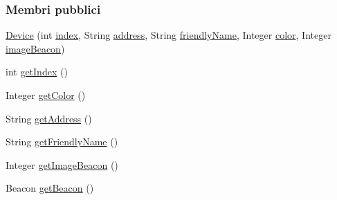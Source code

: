 \subsubsection*{Membri pubblici}
\begin{DoxyCompactItemize}
\item 
\hyperlink{classit_1_1unibo_1_1torsello_1_1bluetoothpositioning_1_1model_1_1Device_a2617f025dd33e0cae4adb3323245f865_a2617f025dd33e0cae4adb3323245f865}{Device} (int \hyperlink{classit_1_1unibo_1_1torsello_1_1bluetoothpositioning_1_1model_1_1Device_a55a01164b2388451f5e8344bfbc61ccc_a55a01164b2388451f5e8344bfbc61ccc}{index}, String \hyperlink{classit_1_1unibo_1_1torsello_1_1bluetoothpositioning_1_1model_1_1Device_a0abcf7e0df4ccc96e487c6f9b90b4e13_a0abcf7e0df4ccc96e487c6f9b90b4e13}{address}, String \hyperlink{classit_1_1unibo_1_1torsello_1_1bluetoothpositioning_1_1model_1_1Device_aa9a540b316c9de7f9b3a94f58570f6d3_aa9a540b316c9de7f9b3a94f58570f6d3}{friendly\+Name}, Integer \hyperlink{classit_1_1unibo_1_1torsello_1_1bluetoothpositioning_1_1model_1_1Device_aaba1f93e2a0f88f01262cb38a65489e6_aaba1f93e2a0f88f01262cb38a65489e6}{color}, Integer \hyperlink{classit_1_1unibo_1_1torsello_1_1bluetoothpositioning_1_1model_1_1Device_a2faee0d51162a4efebfc2db787901019_a2faee0d51162a4efebfc2db787901019}{image\+Beacon})
\item 
int \hyperlink{classit_1_1unibo_1_1torsello_1_1bluetoothpositioning_1_1model_1_1Device_a7f7e47588f721b360447d0f6ae2c4a9d_a7f7e47588f721b360447d0f6ae2c4a9d}{get\+Index} ()
\item 
Integer \hyperlink{classit_1_1unibo_1_1torsello_1_1bluetoothpositioning_1_1model_1_1Device_aad4f2885e5ed0279c7e0c6db684de5c3_aad4f2885e5ed0279c7e0c6db684de5c3}{get\+Color} ()
\item 
String \hyperlink{classit_1_1unibo_1_1torsello_1_1bluetoothpositioning_1_1model_1_1Device_ae4cd3fdda7414388cbda796f62543d5b_ae4cd3fdda7414388cbda796f62543d5b}{get\+Address} ()
\item 
String \hyperlink{classit_1_1unibo_1_1torsello_1_1bluetoothpositioning_1_1model_1_1Device_ab96e3e3bd6e9c9e27a42e619ca03ed71_ab96e3e3bd6e9c9e27a42e619ca03ed71}{get\+Friendly\+Name} ()
\item 
Integer \hyperlink{classit_1_1unibo_1_1torsello_1_1bluetoothpositioning_1_1model_1_1Device_a0fe04c6168a9a13bdf65eb0e5d407d37_a0fe04c6168a9a13bdf65eb0e5d407d37}{get\+Image\+Beacon} ()
\item 
Beacon \hyperlink{classit_1_1unibo_1_1torsello_1_1bluetoothpositioning_1_1model_1_1Device_a61b4951f3153550e8006f043eec034c2_a61b4951f3153550e8006f043eec034c2}{get\+Beacon} ()

\end{DoxyCompactItemize}
